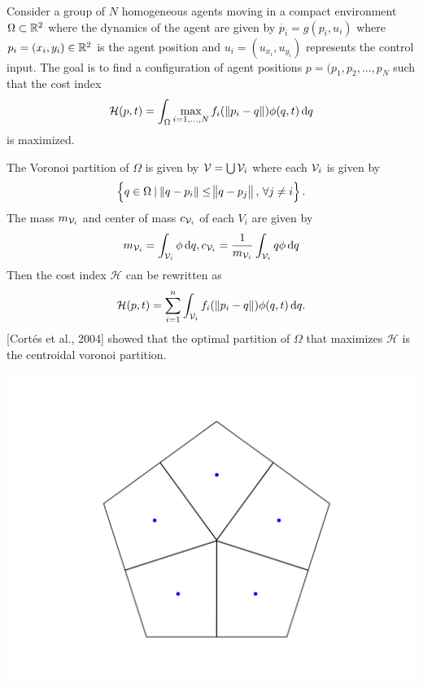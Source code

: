 \documentclass[landscape,a0paper,fontscale=0.292]{baposter}
\begin{document}
\begin{poster}
{
	Consider a group of $N$ homogeneous agents moving in a compact environment $\Omega \subset \mathbb{R}^2$ where the dynamics of the agent are given by $\dot{p_i} = g(p_i, u_i)$ where $p_i = (x_i, y_i) \in \mathbb{R}^2$ is the agent position and $u_i = (u_{x_i}, u_{y_i})$ represents the control input. The goal is to find a configuration of agent positions $p = (p_1, p_2, \dots, p_N$ such that the cost index
	\begin{equation*}
		\displaystyle \mathcal{H}(p, t) = \int_{\Omega}{\max\limits_{i=1,\dots,N}{f_i(\,\norm{p_i - q})} \phi(q, t) \dif q}
	\end{equation*}
	is maximized.
}
{
	The Voronoi partition of $\Omega$ is given by $\mathcal{V} = \bigcup \mathcal{V}_i$ where each $\mathcal{V}_i$ is given by 
	\begin{equation*}
		\displaystyle \left\{ q \in \Omega \: | \: \norm{q - p_i} \leq \norm{q - p_j}, \, \forall j \neq i \right\}.
	\end{equation*}
	The mass $m_{\mathcal{V}_i}$ and center of mass $c_{\mathcal{V}_i}$ of each $V_i$ are given by 
	\begin{equation*}
		\displaystyle m_{\V_i} = \int_{\V_i}{\phi \dif q}, c_{\V_i} = \frac{1}{m_{\V_i}}\int_{\V_i}{q\phi\dif q}
	\end{equation*}
	Then the cost index $\mathcal{H}$ can be rewritten as 
	\begin{equation*}
		\displaystyle \mathcal{H}(p, t) = \sum\limits_{i=1}^{n}{\int_{\V_i}{f_i(\,\norm{p_i - q}) \phi(q, t) \dif q}}.
	\end{equation*}
	\textrm{[Cort\'es et al., 2004]} showed that the optimal partition of $\Omega$ that maximizes $\mathcal{H}$ is the centroidal voronoi partition. 
	\begin{center}
		\includegraphics[scale=0.3]{fig_ex.png}
	\end{center}
}


\end{poster}
\end{document}
